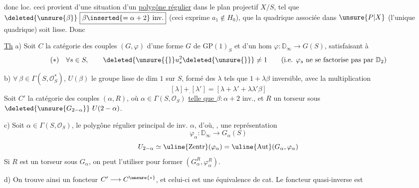 donc loc.  ceci provient d'une situation d'un \uline{polygône régulier}  dans le plan projectif $X/S$, tel que $\deleted{\unsure{\beta}}\ \boxed{\beta\inserted{=\alpha+2}\ \text{inv.}}$ (ceci exprime $a_1\notin H_0$),   que la quadrique  associée  dans $\unsure{P|X}$ (l'unique quadrique) soit lisse.  Donc


\uline{Th}  a) Soit $C$ la catégorie des couples $(G,\varphi)$ d'une forme $G$ de $\mathrm{GP}(1)_S$ et d'un hom $\varphi:\mathbb D_\infty\longrightarrow G(S)$,  satisfaisant à
\[
(\ast)\quad\forall s\in S,\qquad \deleted{\unsure{\{}}u_s^2\deleted{\unsure{\}}}\ne1 \qquad
(\text{i.e. }\varphi_s\text{ ne se factorise pas par }\mathbb D_2)
\]

b) $\forall\ \beta\in\Gamma(S,\mathcal O_S^*)$,   $U(\beta)$ le groupe  lisse  de dim $1$ sur $S$,  formé des $\lambda$ tels que $1+\lambda\beta$ inversible, avec la multiplication
\[
[\lambda]+_{\boldsymbol{.}}[\lambda']=[\lambda+\lambda'+\lambda\lambda'\beta]
\]
Soit $C'$ la catégorie des couples $(\alpha,R)$, où $\alpha\in\Gamma(S,\mathcal O_S)$ \uline{telle que $\beta:\alpha+2$} inv., et $R$ un torseur sous $\deleted{\unsure{G_{2-\alpha}}}\ U(2-\alpha)$.

c) Soit $\alpha\in\Gamma(S,\mathcal O_S)$,   le polygône régulier principal de inv. $\alpha$, d'où, , une représentation
\[
\varphi_\alpha:\mathbb D_\infty\longrightarrow G_\alpha(S)
\]
  
\[
U_{2-\alpha}\simeq\uline{\mathrm{Zentr}}(\varphi_\alpha)=\uline{\mathrm{Aut}}(G_\alpha,\varphi_\alpha)
\]
Si $R$ est un torseur sous $G_\alpha$, on peut l'utiliser pour former $(G_\alpha^R,\varphi_\alpha^R)$.

d) On trouve ainsi un foncteur $C'\longrightarrow C^{\unsure{*}}$, et celui-ci est une équivalence de cat. Le foncteur quasi-inverse est
